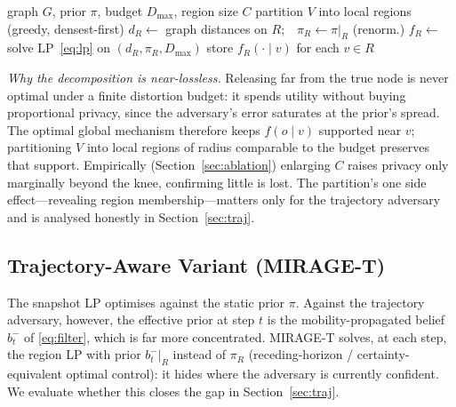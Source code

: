 \documentclass[11pt]{article}
\begin{document}
\begin{algorithm}[t]
\caption{MIRAGE precompute (per graph, offline)}
\label{alg:mirage}
\begin{algorithmic}[1]
\REQUIRE graph $G$, prior $\pi$, budget $D_{\max}$, region size $C$
\STATE partition $V$ into local regions (greedy, densest-first)
  \STATE $d_R\leftarrow$ graph distances on $R$;\ \ $\pi_R\leftarrow\pi|_R$ (renorm.)
  \STATE $f_R\leftarrow$ solve LP~\eqref{eq:lp} on $(d_R,\pi_R,D_{\max})$
  \STATE store $f_R(\cdot\mid v)$ for each $v\in R$
\ENDFOR
\end{algorithmic}
\end{algorithm}

\emph{Why the decomposition is near-lossless.} Releasing far from the true node is
never optimal under a finite distortion budget: it spends utility without buying
proportional privacy, since the adversary's error saturates at the prior's spread.
The optimal global mechanism therefore keeps $f(o\mid v)$ supported near $v$;
partitioning $V$ into local regions of radius comparable to the budget preserves
that support. Empirically (Section~\ref{sec:ablation}) enlarging $C$ raises privacy
only marginally beyond the knee, confirming little is lost. The partition's one
side effect---revealing region membership---matters only for the trajectory
adversary and is analysed honestly in Section~\ref{sec:traj}.

\subsection{Trajectory-Aware Variant (MIRAGE-T)}
The snapshot LP optimises against the static prior $\pi$. Against the trajectory
adversary, however, the effective prior at step $t$ is the mobility-propagated
belief $b_t^-$ of \eqref{eq:filter}, which is far more concentrated. MIRAGE-T
solves, at each step, the region LP with prior $b_t^-|_R$ instead of $\pi_R$
(receding-horizon / certainty-equivalent optimal control): it hides where the
adversary is currently confident. We evaluate whether this closes the gap in
Section~\ref{sec:traj}.

\end{document}
